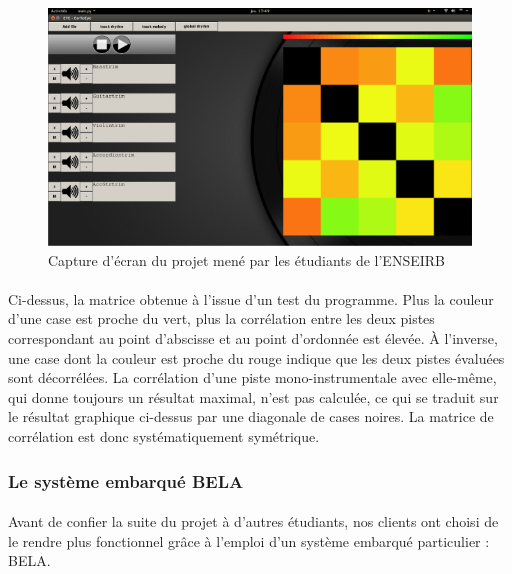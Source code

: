   \begin{figure}[h]
    \centering
    \includegraphics[scale=0.5]{matriceenseirb.png}
    \caption{Capture d'écran du projet mené par les étudiants de l'ENSEIRB}
    \label{matrice-enseirb}
  \end{figure}

\paragraph{}
Ci-dessus, la matrice obtenue à l'issue d'un test du programme. Plus
la couleur d'une case est proche du vert, plus la corrélation entre
les deux pistes correspondant au point d'abscisse et au point
d'ordonnée est élevée. À l'inverse, une case dont la couleur est
proche du rouge indique que les deux pistes évaluées sont
décorrélées. La corrélation d'une piste mono-instrumentale avec
elle-même, qui donne toujours un résultat maximal, n'est pas calculée,
ce qui se traduit sur le résultat graphique ci-dessus par une
diagonale de cases noires. La matrice de corrélation est donc
systématiquement symétrique.

\subsubsection{Le système embarqué BELA}
\paragraph{}
Avant de confier la suite du projet à d'autres étudiants, nos clients
ont choisi de le rendre plus fonctionnel grâce à l'emploi d'un système
embarqué particulier : BELA.

